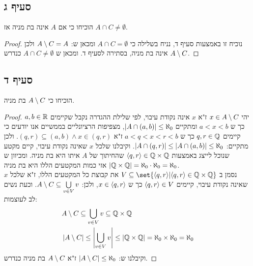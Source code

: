 \documentclass{article}
\DeclarePairedDelimiter\set\{\}
\begin{document}
	\subsection*{סעיף ג}
	הוכיחו כי אם $A$ אינה בת מניה אז $A \cap C \neq \emptyset$.
	\begin{proof}
		נוכיח זו באמצעות סעיף ד,
		נניח בשלילה כי $A \cap C = \emptyset$ ומכאן ש: $A \setminus C = A$ ולכן $A \setminus C$ אינה בת מניה, בסתירה לסעיף ד.
		ומכאן ש $A \cap C \neq \emptyset$ כנדרש.
	\end{proof}

	\subsection*{סעיף ד}
	הוכיחו כי $A \setminus C$ בת מניה.

	\begin{proof}
		יהי $x \in A \setminus C$ ז"א $x$ אינה נקודת עיבוי, לפי שלילת ההגדרה נקבל שקיימים $a,b \in \mathbb{R}$ כך ש $a < x < b$ ומתקיים $\left| A \cap (a,b) \right| \leq \aleph_0$,
		מצפיפות הרציונליים בממשיים אנו יודעים כי קיימים $q,r \in \mathbb{Q}$ כך ש $a < q < x < r < b$ ז"א $(q, r) \subseteq (a,b) \land x \in (q,r)$.
		ולכן מתקיים: $\left| A \cap (q,r) \right| \leq \left| A \cap (a,b) \right| \leq \aleph_0$.
		וקיבלנו שלכל $x$ שאינה נקודת עיבוי, קיים מקטע שנוכל לייצג באמצעות $\langle q, r \rangle \in \mathbb{Q} \times \mathbb{Q}$ שהחיתוך של $A$ איתו היא בת מניה.
		ומכיוון ש $\left| \mathbb{Q} \times \mathbb{Q} \right| = \aleph_0 \cdot \aleph_0 = \aleph_0$ אזי כמות המקטעים הללו היא בת מניה. \\
		נסמן ב $V \subseteq \set{\ang{q,r} | \ang{q,r} \in \QQ \times \QQ}$ את קבוצת כל המקטעים הללו, ז"א שלכל $x$ שאינה נקודת עיבוי, קיימים $\langle q,r \rangle \in V$ כך ש $x \in \langle q,r \rangle$,
		ולכן: $A \setminus C \subseteq \bigcup\limits_{v\in V}v$. וכעת נשים לב לעוצמות:
		\begin{align*}
			&A \setminus C \subseteq \bigcup\limits_{v\in V}v \subseteq \mathbb{Q} \times \mathbb{Q} \\
			&\left| A \setminus C \right| \leq \left| \bigcup\limits_{v\in V}v \right| \leq \left| \mathbb{Q} \times \mathbb{Q} \right| = \aleph_0 \times \aleph_0 = \aleph_0 \\
		\end{align*}
		וקיבלנו ש: $\left| A \setminus C \right| \leq \aleph_0$ ז"א $A \setminus C$ בת מניה כנדרש.
	\end{proof}


	\pagebreak
\end{document}
